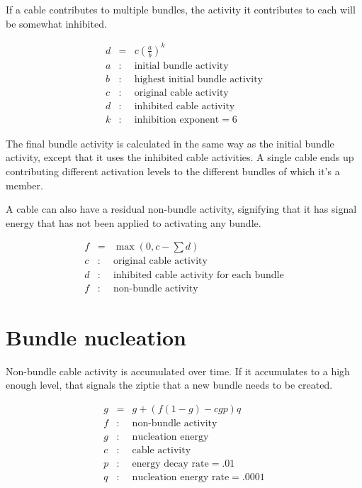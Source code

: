 \documentclass[oneside,twocolumn]{article}
\begin{document}
If a cable contributes to multiple bundles, the activity it contributes to each will be somewhat inhibited.

\begin{eqnarray*}
d &=& c \left( \frac{a}{b} \right) ^ k\\ 
a &:& \mbox{initial bundle activity}\\ 
b &:& \mbox{highest initial bundle activity}\\ 
c &:& \mbox{original cable activity}\\
d &:& \mbox{inhibited cable activity}\\
k &:& \mbox{inhibition exponent} = 6
\end{eqnarray*}

The final bundle activity is calculated in the same way as the initial bundle activity, except that it uses the inhibited cable activities. A single cable ends up contributing different activation levels to the different bundles of which it's a member.

A cable can also have a residual non-bundle activity, signifying that it has signal energy that has not been applied to activating any bundle.

\begin{eqnarray*}
f &=& \max \left (0, c - \sum d \right)\\ 
c &:& \mbox{original cable activity}\\
d &:& \mbox{inhibited cable activity for each bundle}\\
f &:& \mbox{non-bundle activity}
\end{eqnarray*}

\section*{\color{copper} Bundle nucleation}

Non-bundle cable activity is accumulated over time. If it accumulates to a high enough level, that signals the ziptie that a new bundle needs to be created.

\begin{eqnarray*}
g &=& g + (f  (1 - g)  - c  g  p )  q\\ 
f &:& \mbox{non-bundle activity}\\
g &:& \mbox{nucleation energy}\\
c &:& \mbox{cable activity}\\
p &:& \mbox{energy decay rate} = .01\\
q &:& \mbox{nucleation energy rate} = .0001
\end{eqnarray*}
\end{document}
